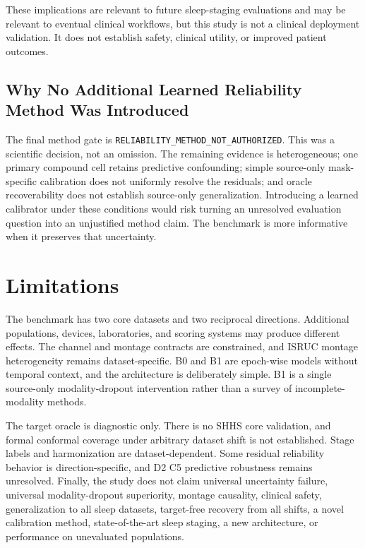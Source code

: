 \documentclass[11pt]{article}
\begin{document}
These implications are relevant to future sleep-staging evaluations and may be relevant to eventual clinical workflows, but this study is not a clinical deployment validation. It does not establish safety, clinical utility, or improved patient outcomes.

\subsection{Why No Additional Learned Reliability Method Was Introduced}
The final method gate is \texttt{RELIABILITY\_METHOD\_NOT\_AUTHORIZED}. This was a scientific decision, not an omission. The remaining evidence is heterogeneous; one primary compound cell retains predictive confounding; simple source-only mask-specific calibration does not uniformly resolve the residuals; and oracle recoverability does not establish source-only generalization. Introducing a learned calibrator under these conditions would risk turning an unresolved evaluation question into an unjustified method claim. The benchmark is more informative when it preserves that uncertainty.

\section{Limitations}
The benchmark has two core datasets and two reciprocal directions. Additional populations, devices, laboratories, and scoring systems may produce different effects. The channel and montage contracts are constrained, and ISRUC montage heterogeneity remains dataset-specific. B0 and B1 are epoch-wise models without temporal context, and the architecture is deliberately simple. B1 is a single source-only modality-dropout intervention rather than a survey of incomplete-modality methods.

The target oracle is diagnostic only. There is no SHHS core validation, and formal conformal coverage under arbitrary dataset shift is not established. Stage labels and harmonization are dataset-dependent. Some residual reliability behavior is direction-specific, and D2 C5 predictive robustness remains unresolved. Finally, the study does not claim universal uncertainty failure, universal modality-dropout superiority, montage causality, clinical safety, generalization to all sleep datasets, target-free recovery from all shifts, a novel calibration method, state-of-the-art sleep staging, a new architecture, or performance on unevaluated populations.
\end{document}
